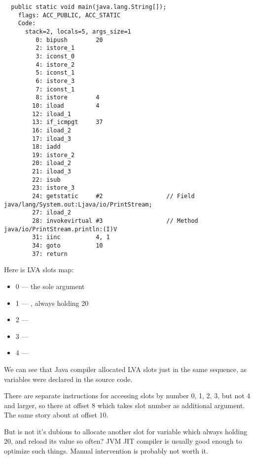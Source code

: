 \begin{lstlisting}
  public static void main(java.lang.String[]);
    flags: ACC_PUBLIC, ACC_STATIC
    Code:
      stack=2, locals=5, args_size=1
         0: bipush        20
         2: istore_1      
         3: iconst_0      
         4: istore_2      
         5: iconst_1      
         6: istore_3      
         7: iconst_1      
         8: istore        4
        10: iload         4
        12: iload_1       
        13: if_icmpgt     37
        16: iload_2       
        17: iload_3       
        18: iadd          
        19: istore_2      
        20: iload_2       
        21: iload_3       
        22: isub          
        23: istore_3      
        24: getstatic     #2                  // Field java/lang/System.out:Ljava/io/PrintStream;
        27: iload_2       
        28: invokevirtual #3                  // Method java/io/PrintStream.println:(I)V
        31: iinc          4, 1
        34: goto          10
        37: return        
\end{lstlisting}
        
Here is \ac{LVA} slots map:

\begin{itemize}
\item 0 --- the sole  argument
\item 1 --- , always holding 20
\item 2 --- 
\item 3 --- 
\item 4 --- 
\end{itemize}

We can see that Java compiler allocated \ac{LVA} slots just in the same sequence, 
as variables were declared in the source code.

There are separate  instructions for accessing slots by number 0, 1, 2, 3, 
but not 4 and larger, so there  at offset 8 
which takes slot number as additional argument.
The same story about  at offset 10.

But is not it's dubious to allocate another slot for  variable which always holding 20, 
and reload its value so often?
\ac{JVM} \ac{JIT} compiler is usually good enough to optimize such things.
Manual intervention is probably not worth it.
